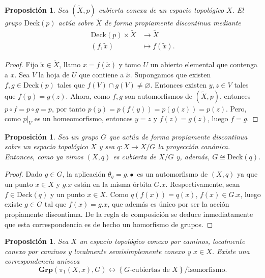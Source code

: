 \documentclass[12pt,a4paper]{book}
\newtheorem{prop}[thm]{Proposición}
\theoremstyle{definition} \newtheorem{defn}[thm]{Definición}
\theoremstyle{definition} \newtheorem{ejemplo}[thm]{Ejemplo}
\theoremstyle{definition} \newtheorem{ejercicio}[thm]{Ejercicio}
\theoremstyle{remark} \newtheorem*{obs}{Observación}
\def\gf{\pi_1}
\def\grp{\mathbf{Grp}}
\def\XX{\tilde{X}}
\def\xx{\tilde{x}}
\def\DD{\mathrm{Deck}}
\begin{document}
\begin{prop}
  Sea $(\XX,p)$ cubierta conexa de un espacio topológico $X$. El grupo $\DD(p)$ actúa sobre $\XX$ de forma propiamente discontinua mediante
  \begin{align*}
     \DD(p) \times \XX&\longrightarrow \XX\\ 
      (f,\xx) &\longmapsto f(\xx). 
    \end{align*}
\end{prop}
\begin{proof}
  Fijo $\xx \in \XX$, llamo $x=f(\xx)$ y tomo $U$ un abierto elemental que contenga a $x$. Sea $V$ la hoja de $U$ que contiene a $\xx$. Supongamos que existen $f,g\in\DD(p)$ tales que $f(V)\cap g(V)\neq \varnothing$. Entonces existen $y,z\in V$ tales que $f(y)=g(z)$. Ahora, como $f,g$ son automorfismos de $(\XX,p)$, entonces $p\circ f=p\circ g=p$, por tanto $p(y)=p(f(y))=p(g(z))=p(z)$. Pero, como $p|_{V}$ es un homeomorfismo, entonces $y=z$ y $f(z)=g(z)$, luego $f=g$. 
\end{proof}

\begin{prop}\label{deckg}
  Sea un grupo $G$ que actúa de forma propiamente discontinua sobre un espacio topológico $X$ y sea $q:X\rightarrow X/G$ la proyección canónica. Entonces, como ya vimos $(X,q)$ es cubierta de $X/G$ y, además, $G\cong \DD(q)$.
\end{prop}
\begin{proof}
  Dado $g\in G$, la aplicación $\theta_g=g.\bullet$ es un automorfismo de $(X,q)$ ya que un punto $x\in X$ y $g.x$ están en la misma órbita $G.x$. Respectivamente, sean $f\in \DD(q)$ y un punto $x\in X$. Como $q(f(x))=q(x)$, $f(x)\in G.x$, luego existe $g\in G$ tal que $f(x)=g.x$, que además es único por ser la acción propiamente discontinua. De la regla de composición se deduce inmediatamente que esta correspondencia es de hecho un homorfismo de grupos.
\end{proof}

\begin{prop}\label{homgcub}
  Sea $X$ un espacio topológico conexo por caminos, localmente conexo por caminos y localmente semisimplemente conexo y $x\in X$. Existe una correspondencia unívoca
  \begin{equation*}
    \grp(\gf(X,x),G) \leftrightarrow \left\{G \text{-cubiertas de } X \right\}/\text{isomorfismo}.
  \end{equation*}
\end{prop}
\end{document}
